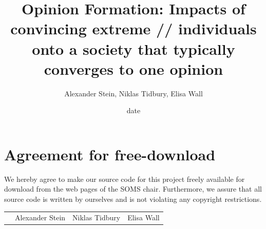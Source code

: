 \documentclass[11pt]{article}
\title{Opinion Formation: Impacts of convincing extreme //
individuals onto a society that typically converges to one opinion}
\author{Alexander Stein, Niklas Tidbury, Elisa Wall}
\date{date}
\begin{document}

\newpage


\newpage
\section*{Agreement for free-download}
\bigskip


\bigskip


\large We hereby agree to make our source code for this project freely available for download from the web pages of the SOMS chair. Furthermore, we assure that all source code is written by ourselves and is not violating any copyright restrictions.

\begin{center}

\bigskip


\bigskip


\begin{tabular}{@{}p{1cm}@{}p{5cm}@{}@{}p{5cm}@{}@{}p{5cm}@{}}
\begin{minipage}{1cm}

\end{minipage}
&
\begin{minipage}{5cm}
\vspace{2mm} \large Alexander Stein

 \vspace{\baselineskip}

\end{minipage}
&
\begin{minipage}{5cm}

\large Niklas Tidbury

\end{minipage}
&
\begin{minipage}{5cm}
	
	\large Elisa Wall
	
\end{minipage}
\end{tabular}


\end{center}
\newpage




\end{document}
